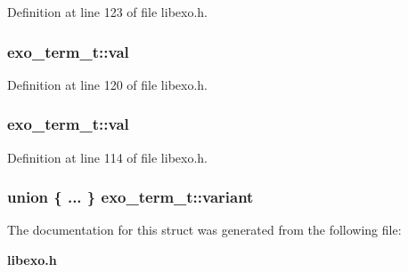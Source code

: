 Definition at line 123 of file libexo.h.
\subsubsection[{val}]{ {\bf exo\_\-term\_\-t::val}}\label{structexo__term__t_ab79b121da17555c91f236f381f5f057}




Definition at line 120 of file libexo.h.
\subsubsection[{val}]{ {\bf exo\_\-term\_\-t::val}}\label{structexo__term__t_19151f180e746c6f35a0768f818c40a5}




Definition at line 114 of file libexo.h.
\subsubsection[{variant}]{\setlength{\rightskip}{0pt plus 5cm}union \{ ... \}   {\bf exo\_\-term\_\-t::variant}}\label{structexo__term__t_bc9acd023c1e307b3c4bb5d8a00b0fe6}




The documentation for this struct was generated from the following file:\begin{CompactItemize}
\item 
{\bf libexo.h}\end{CompactItemize}
